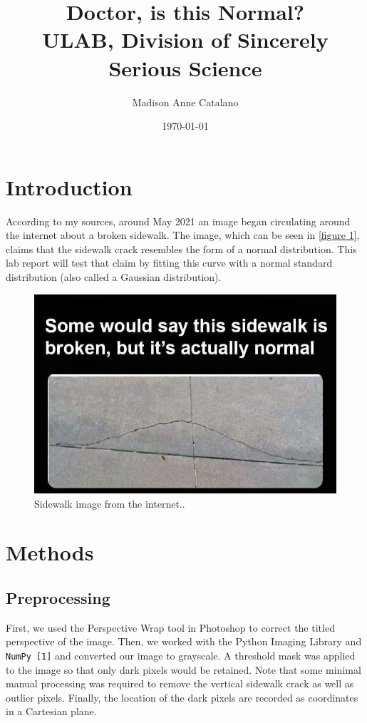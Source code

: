 \documentclass{article}
\title{ Doctor, is this Normal?\\\Large ULAB, Division of Sincerely Serious Science}
\author{Madison Anne Catalano}
\date{\today}
\begin{document}
\maketitle

\section{Introduction}
According to my sources, around May 2021 an image began circulating around the internet about a broken
sidewalk. The image, which can be seen in \autoref{figure 1}, claims that the sidewalk crack resembles the form
of a normal distribution. This lab report will test that claim by fitting this curve with a normal standard
distribution (also called a Gaussian distribution).

\begin{figure}[H]
    \centering
    \includegraphics[width=0.8\linewidth]{img.jpg}
    \caption{Sidewalk image from the internet..}
    \label{figure 1}
\end{figure}


\section{Methods}
\subsection{Preprocessing}
First, we used the Perspective Wrap tool in Photoshop to correct the titled perspective of the image. Then,
we worked with the Python Imaging Library and \texttt{NumPy [1]} and converted our image to grayscale.
A threshold mask was applied to the image so that only dark pixels would be retained. Note that some
minimal manual processing was required to remove the vertical sidewalk crack as well as outlier pixels.
Finally, the location of the dark pixels are recorded as coordinates in a Cartesian plane.
\end{document}

